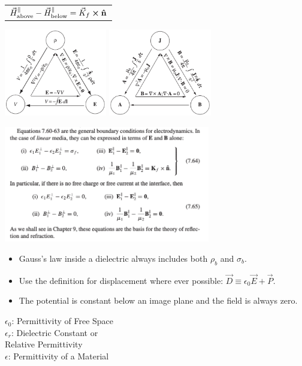 \documentclass{article}
\newcommand{\formbox}[2]{\begin{center} \begin{tcolorbox}[title = #1, boxrule=2pt,arc=3.4pt,boxsep=0mm] #2\end{tcolorbox}\end{center}}
\begin{document}
\begin{multicols*}{2}
{{\begin{tabular}{ l }
            $\vec{H}_\text{above}^\parallel - \vec{H}_\text{below}^\parallel = \vec{K}_f \cross \vu{n}$
        \end{tabular}}
    }
    \formbox{Triangles}{
        \begin{center}
            \includegraphics[height=3.8cm]{em-triangle.png}
            \includegraphics[height=3.8cm]{magnetic-triangle.png}
        \end{center}
    }
    \formbox{More Boundary Conditions}{
        \begin{center}
            \includegraphics[width=9cm]{boundary-conditions.png}
        \end{center}
    }
    \formbox{Takeaways from Practice}{
        \begin{itemize}
            \item Gauss's law inside a dielectric always includes both $\rho_b$ and $\sigma_b$.
            \item Use the definition for displacement where ever possible: $\vec{D} \equiv \epsilon_0 \vec{E} + \vec{P}$.
            \item The potential is constant below an image plane and the field is always zero. 
        \end{itemize}
    }
    \formbox{Names of Stuff}{
        $\epsilon_0$: Permittivity of Free Space\\
        $\epsilon_r$: Dielectric Constant or \\
        \hspace{0.5cm}Relative Permittivity\\
        $\epsilon$: Permittivity of a Material
    }
    
\end{multicols*}
\end{document}
